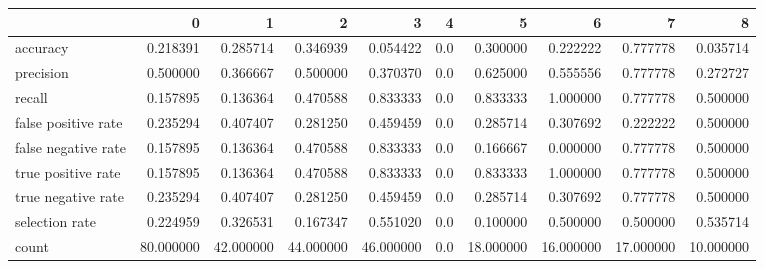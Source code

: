 \begin{tabular}{lrrrrrrrrr}
\toprule
{} &          0 &          1 &          2 &          3 &    4 &          5 &          6 &          7 &          8 \\
\midrule
accuracy            &   0.218391 &   0.285714 &   0.346939 &   0.054422 &  0.0 &   0.300000 &   0.222222 &   0.777778 &   0.035714 \\
precision           &   0.500000 &   0.366667 &   0.500000 &   0.370370 &  0.0 &   0.625000 &   0.555556 &   0.777778 &   0.272727 \\
recall              &   0.157895 &   0.136364 &   0.470588 &   0.833333 &  0.0 &   0.833333 &   1.000000 &   0.777778 &   0.500000 \\
false positive rate &   0.235294 &   0.407407 &   0.281250 &   0.459459 &  0.0 &   0.285714 &   0.307692 &   0.222222 &   0.500000 \\
false negative rate &   0.157895 &   0.136364 &   0.470588 &   0.833333 &  0.0 &   0.166667 &   0.000000 &   0.777778 &   0.500000 \\
true positive rate  &   0.157895 &   0.136364 &   0.470588 &   0.833333 &  0.0 &   0.833333 &   1.000000 &   0.777778 &   0.500000 \\
true negative rate  &   0.235294 &   0.407407 &   0.281250 &   0.459459 &  0.0 &   0.285714 &   0.307692 &   0.777778 &   0.500000 \\
selection rate      &   0.224959 &   0.326531 &   0.167347 &   0.551020 &  0.0 &   0.100000 &   0.500000 &   0.500000 &   0.535714 \\
count               &  80.000000 &  42.000000 &  44.000000 &  46.000000 &  0.0 &  18.000000 &  16.000000 &  17.000000 &  10.000000 \\
\bottomrule
\end{tabular}
